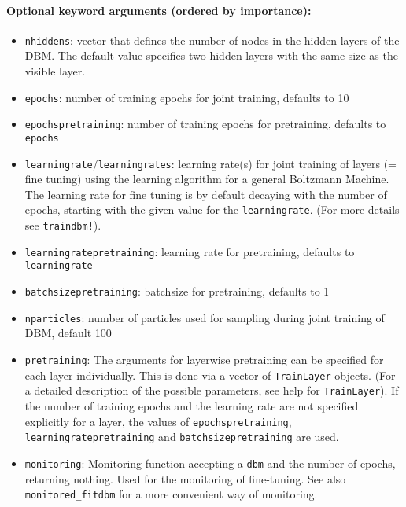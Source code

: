 \paragraph*{Optional keyword arguments (ordered by importance):}
\begin{itemize}
\item \texttt{nhiddens}: vector that defines the number of nodes in the hidden layers of  the DBM. The default value specifies two hidden layers with the same size  as the visible layer.


\item \texttt{epochs}: number of training epochs for joint training, defaults to 10


\item \texttt{epochspretraining}: number of training epochs for pretraining,  defaults to \texttt{epochs}


\item \texttt{learningrate}/\texttt{learningrates}:  learning rate(s) for joint training of layers (= fine tuning)  using the learning algorithm for a general Boltzmann Machine.  The learning rate for fine tuning is by default decaying with the number of epochs,  starting with the given value for the \texttt{learningrate}.  (For more details see \texttt{traindbm!}).


\item \texttt{learningratepretraining}: learning rate for pretraining,  defaults to \texttt{learningrate}


\item \texttt{batchsizepretraining}: batchsize for pretraining, defaults to 1


\item \texttt{nparticles}: number of particles used for sampling during joint training of  DBM, default 100


\item \texttt{pretraining}: The arguments for layerwise pretraining  can be specified for each layer individually.  This is done via a vector of \texttt{TrainLayer} objects.  (For a detailed description of the possible parameters,  see help for \texttt{TrainLayer}).  If the number of training epochs and the learning rate are not specified  explicitly for a layer, the values of \texttt{epochspretraining},  \texttt{learningratepretraining} and \texttt{batchsizepretraining} are used.


\item \texttt{monitoring}: Monitoring function accepting a \texttt{dbm} and the number of epochs,  returning nothing. Used for the monitoring of fine-tuning.  See also \texttt{monitored\_fitdbm} for a more convenient way of monitoring.



\end{itemize}

